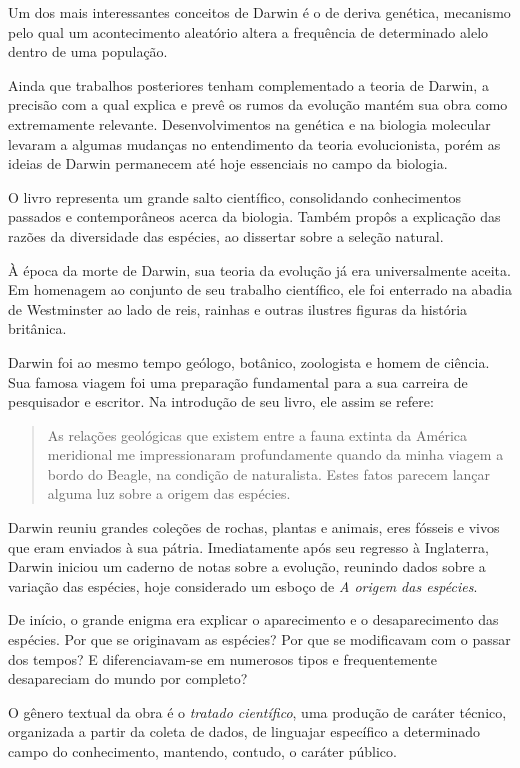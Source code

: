 \documentclass[11pt]{extarticle}
\begin{document}
Um dos mais interessantes conceitos de Darwin é o de deriva genética,  mecanismo pelo qual um acontecimento aleatório altera a frequência de
determinado alelo dentro de uma população.

Ainda que trabalhos posteriores tenham complementado a teoria de Darwin,
a precisão com a qual explica e prevê os rumos da evolução mantém sua obra como
extremamente relevante.
Desenvolvimentos na genética e na biologia molecular levaram a algumas mudanças
no entendimento da teoria evolucionista, porém as ideias de Darwin permanecem
até hoje essenciais no campo da biologia.


O livro representa um grande salto científico, consolidando conhecimentos
passados e contemporâneos acerca da biologia.
Também propôs a explicação das razões da diversidade das espécies, ao
dissertar sobre a seleção natural.

À época da morte de Darwin, sua teoria da evolução já era universalmente
aceita. 
Em homenagem ao conjunto de seu trabalho científico, ele foi enterrado na
abadia de Westminster ao lado de reis, rainhas e outras ilustres figuras da
história britânica. 

Darwin foi ao mesmo tempo geólogo, botânico, zoologista e homem de ciência. 
Sua famosa viagem foi uma preparação fundamental para a sua carreira de
pesquisador e escritor. Na introdução de seu livro, ele assim se refere:  

\begin{quote}
As relações
geológicas que existem entre a fauna extinta da América meridional me
impressionaram profundamente quando da minha viagem a bordo do Beagle, na
condição de naturalista.  Estes fatos parecem lançar alguma luz sobre a origem
das espécies.
\end{quote} 

Darwin reuniu grandes coleções de rochas, plantas
e animais, eres fósseis e vivos que eram enviados à sua pátria. 
Imediatamente após seu regresso à Inglaterra, Darwin iniciou um caderno de
notas sobre a evolução, reunindo dados sobre a variação das espécies,
hoje considerado um esboço de \textit{A origem das espécies}. 

De início, o grande enigma era explicar o aparecimento e o desaparecimento das
espécies. Por que se originavam as espécies? Por que se modificavam com o passar dos tempos? E diferenciavam-se em numerosos tipos e frequentemente desapareciam do mundo por completo?

O gênero textual da obra é o \textit{tratado científico}, uma produção de caráter
técnico, organizada a partir da coleta de dados, de
linguajar específico a determinado campo do conhecimento,  mantendo, contudo,
o caráter público.
\end{document}
